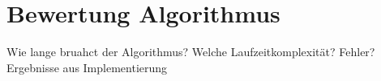 \section{Bewertung Algorithmus}
\label{sec:Bewertung2}

Wie lange bruahct der Algorithmus?
Welche Laufzeitkomplexität?
Fehler?
Ergebnisse aus Implementierung





